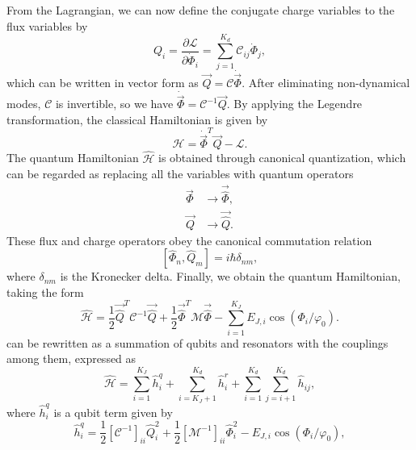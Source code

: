 \documentclass[a4paper,onecolumn,11pt,unpublished]{quantumarticle}
\begin{document}
From the Lagrangian, we can now define the conjugate charge variables to the flux variables by 
\begin{equation}
    Q_i = \frac{\partial \mathcal{L}}{\partial \dot{\Phi}_i} = \sum_{j=1}^{K_d} \mathcal{C}_{ij} \dot{\Phi}_j,
\end{equation}
which can be written in vector form as $\vec Q = \mathcal{C} \dot{\vec{\Phi}}$. After eliminating non-dynamical modes, $\mathcal{C}$ is invertible, so we have $\dot{\vec{\Phi}} = \mathcal{C}^{-1} \vec{Q}$.
By applying the Legendre transformation, the classical Hamiltonian is given by
\begin{equation}
    \mathcal{H} = \dot{\vec{\Phi}}^T \vec{Q} - \mathcal{L}. 
\end{equation}
The quantum Hamiltonian $\hat{\mathcal{H}}$ is obtained through canonical quantization, which can be regarded as replacing all the variables with quantum operators
\begin{equation}
    \begin{aligned}
    \vec{\Phi} & \rightarrow \vec{\hat{\Phi}}, \\
    \vec{Q} & \rightarrow \vec{\hat{Q}}.
    \end{aligned}
\end{equation}
These flux and charge operators obey the canonical commutation relation
\begin{equation}
    \left[ \hat{\Phi}_n, \hat{Q}_m \right] = i \hbar \delta_{nm},
\end{equation}
where $\delta_{nm}$ is the Kronecker delta. Finally, we obtain the quantum Hamiltonian, taking the form
\begin{equation}
    \hat{\mathcal{H}} = \frac{1}{2} \vec{\hat{Q}}^T \mathcal{C}^{-1} \vec{\hat{Q}}
    + \frac{1}{2} \vec {\hat{\Phi}}^T \mathcal{M} \vec{\hat{\Phi}} 
    - \sum_{i=1}^{K_J} E_{J, i} \cos\left(\Phi_i / \varphi_0\right).
    \label{eq:circuit_hamiltonian}
\end{equation}
 can be rewritten as a summation of qubits and resonators with the couplings among them, expressed as
\begin{equation}
    \hat{\mathcal{H}} = \sum_{i=1}^{K_J} \hat{h}_{i}^q 
    + \sum_{i=K_J + 1}^{K_d} \hat{h}_{i}^{r} + \sum_{i=1}^{K_d}\sum_{j=i+1}^{K_d} \hat{h}_{ij},
    \label{eq:circuit_hamiltonian_rewrite}
\end{equation}
where $\hat{h}_{i}^q $ is a qubit term given by
\begin{equation}
    \hat{h}_{i}^q = \frac{1}{2} \left[ \mathcal{C}^{-1} \right]_{ii} \hat{Q}_i^2
    + \frac{1}{2} \left[ \mathcal{M}^{-1} \right]_{ii} \hat{\Phi}_i^2
    - E_{J, i} \cos\left(\Phi_i / \varphi_0\right),
\end{equation}
\end{document}
